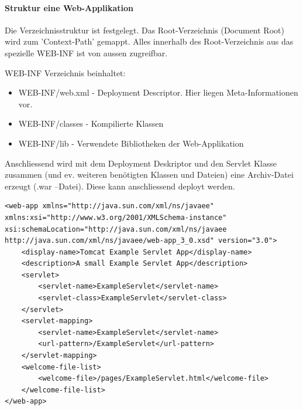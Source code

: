 \paragraph{Struktur eine Web-Applikation}
Die Verzeichnisstruktur ist festgelegt. Das Root-Verzeichnis (Document Root) wird zum 'Context-Path' gemappt. Alles innerhalb des Root-Verzeichnis aus das spezielle WEB-INF ist von aussen zugreifbar.

WEB-INF Verzeichnis beinhaltet:
\begin{itemize}
	\item WEB-INF/web.xml - Deployment Descriptor. Hier liegen Meta-Informationen vor.
	\item WEB-INF/classes - Kompilierte Klassen
	\item WEB-INF/lib - Verwendete Bibliotheken der Web-Applikation
\end{itemize}

Anschliessend wird mit dem Deployment Deskriptor und den Servlet Klasse zusammen (und ev. weiteren benötigten Klassen und Dateien) eine Archiv-Datei erzeugt (.war –Datei). Diese kann anschliessend deployt werden.

\begin{lstlisting}[caption=web.xml Sample]
<web-app xmlns="http://java.sun.com/xml/ns/javaee" xmlns:xsi="http://www.w3.org/2001/XMLSchema-instance" xsi:schemaLocation="http://java.sun.com/xml/ns/javaee http://java.sun.com/xml/ns/javaee/web-app_3_0.xsd" version="3.0">
	<display-name>Tomcat Example Servlet App</display-name>
	<description>A small Example Servlet App</description>
	<servlet>
		<servlet-name>ExampleServlet</servlet-name>
		<servlet-class>ExampleServlet</servlet-class>
	</servlet>
	<servlet-mapping>
		<servlet-name>ExampleServlet</servlet-name>
		<url-pattern>/ExampleServlet</url-pattern>
	</servlet-mapping>
	<welcome-file-list>
		<welcome-file>/pages/ExampleServlet.html</welcome-file>
	</welcome-file-list>
</web-app>
\end{lstlisting}




